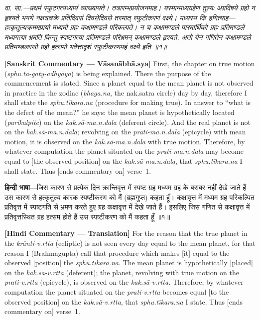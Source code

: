 \documentclass[11pt,a4paper]{book}
\newcommand{\dev}[1]{{\devanagarifont #1}}
\newcommand{\sktcommbilingual}[2]{%
  \par\vspace{0.5em}%
  \noindent\begin{minipage}[t]{0.48\textwidth}
    \RaggedRight\small\itshape
    \dev{#1}
  \end{minipage}%
  \hfill
  \begin{minipage}[t]{0.48\textwidth}
    \RaggedRight\small
    #2%
  \end{minipage}%
  \par\vspace{0.5em}%
}
\newcommand{\hindicommbilingual}[2]{%
  \par\vspace{0.5em}%
  \noindent\begin{minipage}[t]{0.48\textwidth}
    \RaggedRight\small
    \dev{#1}
  \end{minipage}%
  \hfill
  \begin{minipage}[t]{0.48\textwidth}
    \RaggedRight\small
    #2%
  \end{minipage}%
  \par\vspace{0.5em}%
}
\begin{document}
\sktcommbilingual{%
\dev{वा. सा.}---प्रथमं स्फुटगत्यध्यायं व्याख्यायते। तत्रारम्भप्रयोजनमाह। यस्मान्मध्यग्रहेण तुल्यः अग्रविषये ग्रहो न हृश्यते भगणे नक्षत्रचक्रे प्रतिदिवसं दिवसेदिवसे तस्मात्‌ स्फुटीकरणं वक्ष्ये। मध्यस्य किं हगित्याह---हत्कृतुल्यक्रममप्रायो मध्यमो ग्रहः कक्षामण्डले परिकल्पते। न च कक्षामण्डले पारमार्थिको ग्रहः प्रतिमण्डले मध्यगत्या भ्रमति किन्तु स्पष्टगत्या प्रतिमण्डले परिभ्रमन्‌ कक्षामण्डले हृश्यते, अतो येन गणितेन कक्षामण्डले प्रतिमण्डलस्थो ग्रहो हत्समो भवेत्तादृशं स्फुटीकरणमहं वक्ष्ये इति ॥१॥
}{%
\textbf{[Sanskrit Commentary --- Vāsanābhā.sya]} First, the chapter on true motion (\textit{sphu.ta-gaty-adhyāya}) is being explained. There the purpose of the commencement is stated. Since a planet equal to the mean planet is not observed in practice in the zodiac (\textit{bhaga.na}, the nak.satra circle) day by day, therefore I shall state the \textit{sphu.tīkara.na} (procedure for making true). In answer to ``what is the defect of the mean?'' he says: the mean planet is hypothetically located (\textit{parikalpite}) on the \textit{kak.sā-ma.n.dala} (deferent circle). And the real planet is not on the \textit{kak.sā-ma.n.dala}; revolving on the \textit{prati-ma.n.dala} (epicycle) with mean motion, it is observed on the \textit{kak.sā-ma.n.dala} with true motion. Therefore, by whatever computation the planet situated on the \textit{prati-ma.n.dala} may become equal to [the observed position] on the \textit{kak.sā-ma.n.dala}, that \textit{sphu.tīkara.na} I shall state. Thus [ends commentary on] verse~1.
}

\hindicommbilingual{%
\textbf{हिन्दी भाषा}---जिस कारण से प्रत्येक दिन क्रान्तिवृत्त में स्पष्ट ग्रह मध्यम ग्रह के बराबर नहीं देखे जाते हैं उस कारण से हत्कृतुल्य कारक स्पष्टीकरण को मैं (ब्रह्मगुप्त) कहता हूँ। कक्षावृत्त में मध्यम ग्रह परिकल्पित प्रतिवृत्त में स्पष्टगति से भ्रमण करते हुए ग्रह कक्षावृत्त में देखे जाते हैं। इसलिए जिस गणित से कक्षावृत्त में प्रतिवृत्तस्थित ग्रह हत्सम होते हैं उस स्पष्टीकरण को मैं कहता हूँ ॥१॥
}{%
\textbf{[Hindi Commentary --- Translation]} For the reason that the true planet in the \textit{krānti-v.rtta} (ecliptic) is not seen every day equal to the mean planet, for that reason I (Brahmagupta) call that procedure which makes [it] equal to the observed [position] the \textit{sphu.tīkara.na}. The mean planet is hypothetically [placed] on the \textit{kak.sā-v.rtta} (deferent); the planet, revolving with true motion on the \textit{prati-v.rtta} (epicycle), is observed on the \textit{kak.sā-v.rtta}. Therefore, by whatever computation the planet situated on the \textit{prati-v.rtta} becomes equal [to the observed position] on the \textit{kak.sā-v.rtta}, that \textit{sphu.tīkara.na} I state. Thus [ends commentary on] verse~1.
}
\end{document}
